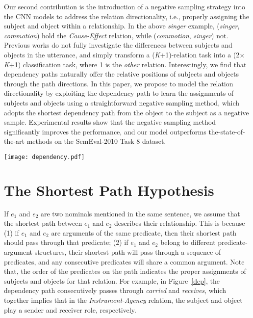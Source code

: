 \documentclass[11pt,a4paper]{article}
\begin{document}
Our second contribution is the introduction of a negative sampling strategy into the CNN models to address the relation directionality, i.e., properly assigning the subject and object within a relationship. In the above \textit{singer} example, (\textit{singer},  \textit{commotion}) hold the \textit{Cause-Effect} relation, while (\textit{commotion}, \textit{singer}) not. Previous works do not fully investigate the differences between subjects and objects in the utterance, and simply transform  a (\textit{K}+1)-relation task into a (2$\times$\textit{K}+1) classification task, where 1 is the \textit{other} relation. Interestingly, we find that dependency paths naturally offer the relative positions of subjects and objects through the path directions.  In this paper, we propose to model the relation directionality by exploiting the dependency path to learn the assignments of subjects and objects using a straightforward negative sampling method, which adopts the shortest dependency path from the object to the subject as a negative sample. Experimental results show that the negative sampling method significantly improves the performance, and our model outperforms the-state-of-the-art methods on the SemEval-2010 Task 8 dataset.










\begin{figure*}[htp!]
\centering\texttt{[image: dependency.pdf]} 
\caption{ \label{dep} The shortest dependency path representation for an example sentence from SemEval-08.}
\end{figure*}
\section{The Shortest Path Hypothesis}
If $e_1$ and $e_2$ are two nominals mentioned in the same sentence, we assume that the shortest path between $e_1$ and $e_2$ describes their relationship. This is because 
(1) if $e_1$ and $e_2$ are arguments of the same predicate, then their shortest path should
 pass through that predicate; 
(2) if $e_1$ and $e_2$ belong to different predicate-argument structures, their shortest path will pass through a sequence of predicates,  
and any consecutive predicates  will share a common argument. Note that, the order of the predicates on the path indicates the proper assignments of subjects and objects for that relation. For example, in Figure~\ref{dep}, the dependency path consecutively passes through  \textit{carried} and \textit{receives}, which together implies that in the \textit{Instrument-Agency} relation, the subject and object play a sender and receiver role, respectively. 
\end{document}
